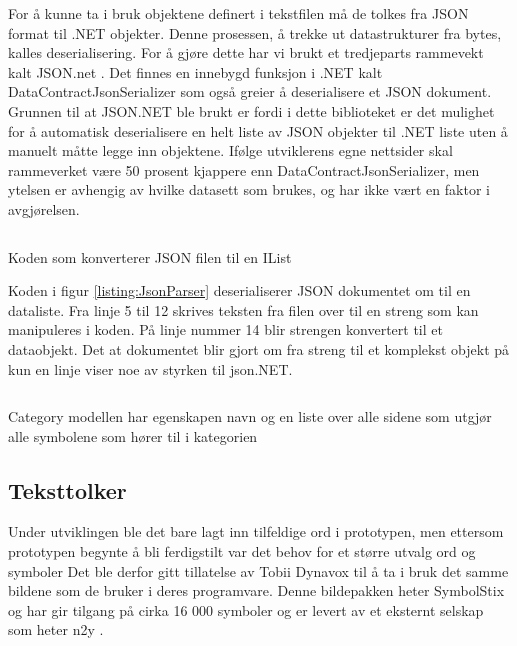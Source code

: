 {For å kunne ta i bruk objektene definert i tekstfilen må de tolkes fra JSON format til .NET objekter. Denne prosessen, å trekke ut datastrukturer fra bytes, kalles deserialisering. For å gjøre dette har vi brukt et tredjeparts rammevekt kalt JSON.net \cite{Json.0:online}. Det finnes en innebygd funksjon i .NET kalt DataContractJsonSerializer \cite{DataC3:online} som også greier å deserialisere et JSON dokument. Grunnen til at JSON.NET ble brukt er fordi i dette biblioteket er det mulighet for å automatisk deserialisere en helt liste av JSON objekter til .NET liste uten å manuelt måtte legge inn objektene. Ifølge utviklerens egne nettsider skal rammeverket være 50 prosent kjappere enn DataContractJsonSerializer, men ytelsen er avhengig av hvilke datasett som brukes, og har ikke vært en faktor i avgjørelsen. 


\begin{listing}[ht] 
\inputminted[fontsize=\footnotesize, frame=lines,framesep=2mm,baselinestretch=1.2,bgcolor=lightgray,linenos]{csharp}{Code/JSONparser.cs} 
\caption{Koden som konverterer JSON filen til en IList} 
\label{listing:JsonParser} 
\end{listing} 


Koden i figur \ref{listing:JsonParser} deserialiserer JSON dokumentet om til en dataliste. Fra linje 5 til 12 skrives teksten fra filen over til en streng som kan manipuleres i koden. På linje nummer 14 blir strengen konvertert til et dataobjekt. Det at dokumentet blir gjort om fra streng til et komplekst objekt på kun en linje viser noe av styrken til json.NET. 

\begin{listing}[ht] 
\inputminted[fontsize=\footnotesize, frame=lines,framesep=2mm,baselinestretch=1.2,bgcolor=lightgray,linenos]{csharp}{Code/CategoryModel.cs} 
\caption{Category modellen har egenskapen navn og en liste over alle sidene som utgjør alle symbolene som hører til i kategorien} 
\label{listing:CategoryModel} 
\end{listing} 


\subsection{Teksttolker}

Under utviklingen ble det bare lagt inn tilfeldige ord i prototypen, men ettersom prototypen begynte å bli ferdigstilt var det behov for et større utvalg ord og symboler Det ble derfor gitt tillatelse av Tobii Dynavox til å ta i bruk det samme bildene som de bruker i deres programvare. Denne bildepakken heter SymbolStix og har gir tilgang på cirka 16 000 symboler og er levert av et eksternt selskap som heter n2y \cite{n2y}. 

}
